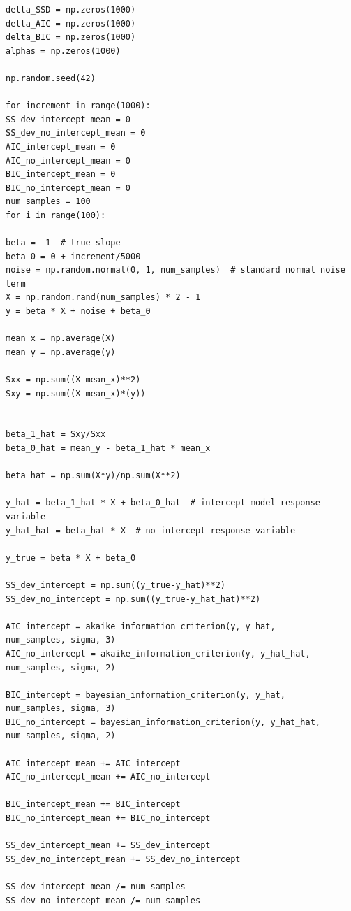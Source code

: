 \documentclass[12pt,a4paper,oneside]{book} %
\begin{document}
	
\begin{mdframed}[linecolor=black, topline=true, bottomline=true,
	leftline=false, rightline=false, backgroundcolor=yellow!20!white]
	\begin{verbatim}
delta_SSD = np.zeros(1000)
delta_AIC = np.zeros(1000)
delta_BIC = np.zeros(1000)
alphas = np.zeros(1000)

np.random.seed(42)

for increment in range(1000):
SS_dev_intercept_mean = 0
SS_dev_no_intercept_mean = 0
AIC_intercept_mean = 0
AIC_no_intercept_mean = 0
BIC_intercept_mean = 0
BIC_no_intercept_mean = 0
num_samples = 100 
for i in range(100):

beta =  1  # true slope
beta_0 = 0 + increment/5000
noise = np.random.normal(0, 1, num_samples)  # standard normal noise term
X = np.random.rand(num_samples) * 2 - 1
y = beta * X + noise + beta_0

mean_x = np.average(X)
mean_y = np.average(y)

Sxx = np.sum((X-mean_x)**2)
Sxy = np.sum((X-mean_x)*(y))


beta_1_hat = Sxy/Sxx
beta_0_hat = mean_y - beta_1_hat * mean_x

beta_hat = np.sum(X*y)/np.sum(X**2)

y_hat = beta_1_hat * X + beta_0_hat  # intercept model response variable
y_hat_hat = beta_hat * X  # no-intercept response variable

y_true = beta * X + beta_0

SS_dev_intercept = np.sum((y_true-y_hat)**2)
SS_dev_no_intercept = np.sum((y_true-y_hat_hat)**2)

AIC_intercept = akaike_information_criterion(y, y_hat,
num_samples, sigma, 3)
AIC_no_intercept = akaike_information_criterion(y, y_hat_hat,
num_samples, sigma, 2)

BIC_intercept = bayesian_information_criterion(y, y_hat,
num_samples, sigma, 3)
BIC_no_intercept = bayesian_information_criterion(y, y_hat_hat,
num_samples, sigma, 2)

AIC_intercept_mean += AIC_intercept
AIC_no_intercept_mean += AIC_no_intercept

BIC_intercept_mean += BIC_intercept
BIC_no_intercept_mean += BIC_no_intercept

SS_dev_intercept_mean += SS_dev_intercept
SS_dev_no_intercept_mean += SS_dev_no_intercept

SS_dev_intercept_mean /= num_samples
SS_dev_no_intercept_mean /= num_samples


\end{verbatim}
\end{mdframed}
\end{document}
